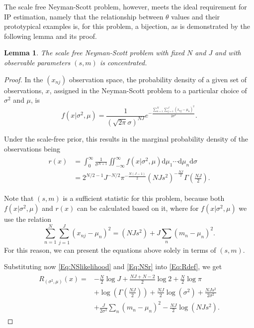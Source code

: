\documentclass{IEEEtran}
\newtheorem{lemma}{Lemma}
\begin{document}
The scale free Neyman-Scott problem, however, meets the ideal requirement
for IP estimation, namely that the relationship between $\theta$ values
and their prototypical examples is, for this problem, a bijection, as is
demonstrated by the following lemma and its proof.

\begin{lemma}\label{L:NSconcentrated}
The scale free Neyman-Scott problem with fixed $N$ and $J$ and with
observable parameters $(s,m)$ is concentrated.
\end{lemma}

\begin{proof}
In the $(x_{nj})$ observation space, the probability density of a given set of
observations, $x$, assigned in the Neyman-Scott problem to a particular choice
of $\sigma^2$ and $\mu$, is
\begin{equation}\label{Eq:NSlikelihood}
f(x |\sigma^2, \mu)
=\frac{1}{(\sqrt{2\pi}\sigma)^{NJ}} e^{-\frac{\sum_{n=1}^{N} \sum_{j=1}^{J}(x_{nj}-\mu_n)^2}{2\sigma^2}}.
\end{equation}

Under the scale-free prior, this results in the marginal probability density
of the observations being
\begin{align}\label{Eq:NSr}
\begin{split}
r( x ) &=\int_{0}^{\infty} \frac{1}{\sigma^{N+1}} \iint_{-\infty}^{\infty} f(x|\sigma^2,\mu) \text{d}\mu_1\cdots\text{d}\mu_n\text{d}\sigma \\
&=2^{N/2-1} J^{-N/2} \pi^{-\frac{N(J-1)}{2}} (NJs^2)^{-\frac{NJ}{2}}\Gamma\left(\frac{NJ}{2}\right).
\end{split}
\end{align}

Note that $(s,m)$ is a sufficient statistic for this problem, because both
$f(x |\sigma^2, \mu)$ and $r(x)$ can be calculated
based on it, where for $f(x |\sigma^2, \mu)$ we use the relation
\[
\sum_{n=1}^{N} \sum_{j=1}^{J}(x_{nj}-\mu_n)^2 = (NJs^2)+J\sum_n (m_n-\mu_n)^2.
\]
For this reason, we can present the equations above solely in terms of $(s,m)$.

Substituting now \eqref{Eq:NSlikelihood} and \eqref{Eq:NSr} into
\eqref{Eq:Rdef}, we get
\begin{align}\label{Eq:R_NS}
\begin{split}
R_{(\sigma^2, \mu)}( x )
=&-\frac{N}{2}\log J+\frac{NJ+N-2}{2}\log 2 +\frac{N}{2}\log\pi \\
&+\log\left(\Gamma\left(\frac{NJ}{2}\right)\right)+\frac{NJ}{2}\log(\sigma^2)+\frac{NJs^2}{2\sigma^2} \\
&+\frac{J}{2\sigma^2}\sum_n (m_n-\mu_n)^2-\frac{NJ}{2}\log(NJs^2).
\end{split}
\end{align}


\end{proof}
\end{document}
